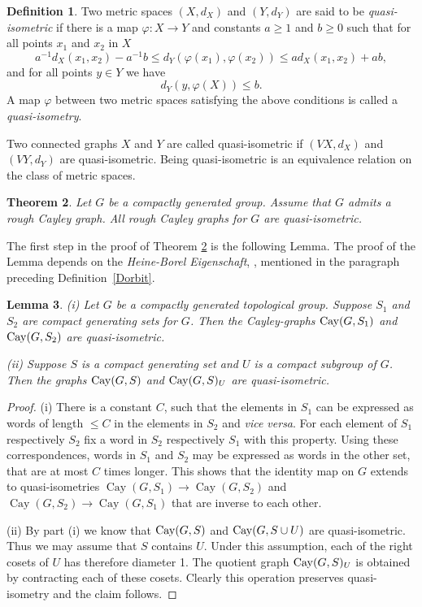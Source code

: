 \documentclass{emsprocart}
\newtheorem{theorem}{Theorem}[section]
\newtheorem{lemma}[theorem]{Lemma}
\theoremstyle{definition}
\newtheorem{definition}[theorem]{Definition}
\begin{document}
\begin{definition}
Two metric spaces $(X, d_X)$ and $(Y, d_Y)$ are said to be {\em
  quasi-isometric} if there is a map $\varphi:X\rightarrow Y$ and 
constants $a\geq 1$ and $b\geq 0$ such that for all points
  $x_1$ and $x_2$ in $X$
\[a^{-1}d_X(x_1, x_2)-a^{-1}b\leq d_Y(\varphi(x_1), \varphi(x_2))
\leq ad_X(x_1, x_2)+ab,\]
and for all points $y\in Y$ we have
\[d_Y(y, \varphi(X))\leq b.\]
A map $\varphi$ between two metric spaces satisfying the above
conditions is called a {\em quasi-isometry}.
\end{definition}

Two connected graphs $X$ and $Y$ are called quasi-isometric if $(VX,
d_X)$ and $(VY, d_Y)$ are quasi-isometric. 
Being quasi-isometric is an equivalence relation on the class of
metric spaces. 

\begin{theorem}\label{Tquasi}
Let $G$ be a compactly generated group.  Assume that $G$ admits a rough Cayley graph.
All rough Cayley graphs for $G$ are quasi-isometric.
\end{theorem}

The first step in the proof of Theorem \ref{Tquasi} is the following
Lemma. The proof
of the Lemma depends on the {\em Heine-Borel Eigenschaft},
\cite[2.3 Heine-Borel-Eigenschaft]{Abels1974}, mentioned in the
paragraph preceding Definition~\ref{Dorbit}.

\begin{lemma} \label{Lquasi}
(i) Let $G$ be a compactly generated topological group.  Suppose $S_1$ and
$S_2$ are compact generating sets for $G$.  Then the Cayley-graphs
${\mbox{${\rm Cay}$}}(G, S_1)$ and ${\mbox{${\rm Cay}$}}(G, S_2)$ are quasi-isometric.

(ii) Suppose $S$ is a
compact generating set and
$U$ is a compact subgroup of $G$.
Then the graphs
${\mbox{${\rm Cay}$}}(G, S)$ and ${\mbox{${\rm Cay}$}}(G, S)_U$ are quasi-isometric.
\end{lemma}

\noindent
\begin{proof}  (i)  There is a constant $C$, such that the elements in $S_1$ can be
expressed as words of length $\leq C$ in the elements in $S_2$
and {\em vice versa}. For each element of $S_1$ respectively $S_2$
fix a word in $S_2$ respectively $S_1$ with this property.
Using these correspondences, words in $S_1$ and $S_2$ may be
expressed as words in the other set, that are at most $C$ times longer.
This shows that the identity map on $G$ extends to quasi-isometries
$\operatorname{Cay}(G, S_1)\to \operatorname{Cay}(G, S_2)$ and
$\operatorname{Cay}(G, S_2)\to \operatorname{Cay}(G, S_1)$
that are inverse to each other.

(ii) By part (i)  we know that ${\mbox{${\rm Cay}$}}(G, S)$ and
${\mbox{${\rm Cay}$}}(G, S\cup U)$ are quasi-isometric.  Thus we may assume that $S$
contains $U$.  Under this assumption, each of the right cosets of $U$ has therefore diameter 1.
The quotient graph ${\mbox{${\rm Cay}$}}(G, S)_U$ is obtained by contracting each of these
cosets.  Clearly this operation preserves quasi-isometry and the claim follows.   \end{proof}
\end{document}
